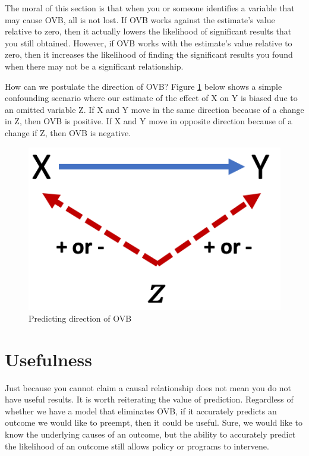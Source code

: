 \documentclass[
]{book}
\begin{document}
The moral of this section is that when you or someone identifies a variable that may cause OVB, all is not lost. If OVB works against the estimate's value relative to zero, then it actually lowers the likelihood of significant results that you still obtained. However, if OVB works with the estimate's value relative to zero, then it increases the likelihood of finding the significant results you found when there may not be a significant relationship.

How can we postulate the direction of OVB? Figure \ref{fig:dagovbdirect} below shows a simple confounding scenario where our estimate of the effect of X on Y is biased due to an omitted variable Z. If X and Y move in the same direction because of a change in Z, then OVB is positive. If X and Y move in opposite direction because of a change if Z, then OVB is negative.

\begin{figure}
\includegraphics[width=6.35in]{images/dag_ovbdirect} \caption{Predicting direction of OVB}\label{fig:dagovbdirect}
\end{figure}

\hypertarget{usefulness}{%
\section{Usefulness}\label{usefulness}}

Just because you cannot claim a causal relationship does not mean you do not have useful results. It is worth reiterating the value of prediction. Regardless of whether we have a model that eliminates OVB, if it accurately predicts an outcome we would like to preempt, then it could be useful. Sure, we would like to know the underlying causes of an outcome, but the ability to accurately predict the likelihood of an outcome still allows policy or programs to intervene.
\end{document}
